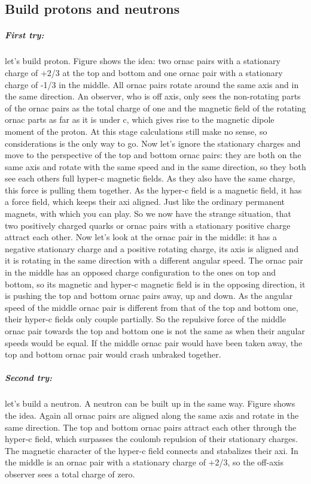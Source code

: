 \subsection{Build protons and neutrons}

\subparagraph{First try:} 
let's build proton. Figure shows the idea: two ornac pairs with a stationary charge of +2/3 at the top and bottom and one ornac pair with a stationary charge of -1/3 in the middle. All ornac pairs rotate around the same axis and in the same direction. An observer, who is off axis, only sees the non-rotating parts of the ornac pairs as the total charge of one and the magnetic field of the rotating ornac parts as far as it is under c, which gives rise to the magnetic dipole moment of the proton. At this stage calculations still make no sense, so considerations is the only way to go. Now let's ignore the stationary charges and move to the perspective of the top and bottom ornac pairs: they are both on the same axis and rotate with the same speed and in the same direction, so they both see each others full hyper-c magnetic fields. As they also have the same charge, this force is pulling them together. As the hyper-c field is a magnetic field, it has a force field, which keeps their axi aligned. Just like the ordinary permanent magnets, with which you can play. So we now have the strange situation, that two positively charged quarks or ornac pairs with a stationary positive charge attract each other. Now let's look at the ornac pair in the middle: it has a negative stationary charge and a positive rotating charge, its axis is aligned and it is rotating in the same direction with a different angular speed. The ornac pair in the middle has an opposed charge configuration to the ones on top and bottom, so its magnetic and hyper-c magnetic field is in the opposing direction, it is pushing the top and bottom ornac pairs away, up and down. As the angular speed of the middle ornac pair is different from that of the top and bottom one, their hyper-c fields only couple partially. So the repulsive force of the middle ornac pair towards the top and bottom one is not the same as when their angular speeds would be equal. If the middle ornac pair would have been taken away, the top and bottom ornac pair would crash unbraked together.

\subparagraph{Second try:}
let's build a neutron. A neutron can be built up in the same way. Figure shows the idea. Again all ornac pairs are aligned along the same axis and rotate in the same direction. The top and bottom ornac pairs attract each other through the hyper-c field, which surpasses the coulomb repulsion of their stationary charges. The magnetic character of the hyper-c field connects and stabalizes their axi. In the middle is an ornac pair with a stationary charge of +2/3, so the off-axis observer sees a total charge of zero.

